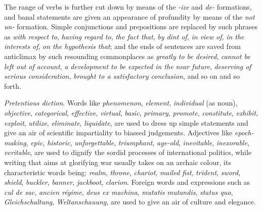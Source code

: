 The range of verbs is further cut down by means of the \textit{-ize} and \textit{de-} formations, and banal statements are given an appearance of profundity by means of the \textit{not un-} formation. Simple conjunctions and prepositions are replaced by such phrases as \textit{with respect to},\textit{ having regard to}, \textit{the fact that}, \textit{by dint of}, \textit{in view of}, \textit{in the interests of}, \textit{on the hypothesis that}; and the ends of sentences are saved from anticlimax by such resounding commonplaces as \textit{greatly to be desired}, \textit{cannot be left out of account}, \textit{a development to be expected in the near future}, \textit{deserving of serious consideration}, \textit{brought to a satisfactory conclusion}, and so on and so forth.\par

\textit{Pretentious diction}. Words like \textit{phenomenon}, \textit{element}, \textit{individual }(as noun), \textit{objective}, \textit{categorical}, \textit{effective}, \textit{virtual}, \textit{basic}, \textit{primary}, \textit{promote}, \textit{constitute}, \textit{exhibit}, \textit{exploit}, \textit{utilize}, \textit{eliminate}, \textit{liquidate}, are used to dress up simple statements and give an air of scientific impartiality to biassed judgements. Adjectives like \textit{epoch-making}, \textit{epic}, \textit{historic}, \textit{unforgettable}, \textit{triumphant}, \textit{age-old}, \textit{inevitable}, \textit{inexorable}, \textit{veritable}, are used to dignify the sordid processes of international politics, while writing that aims at glorifying war usually takes on an archaic colour, its characteristic words being: \textit{realm}, \textit{throne}, \textit{chariot}, \textit{mailed fist}, \textit{trident}, \textit{sword}, \textit{shield}, \textit{buckler}, \textit{banner}, \textit{jackboot}, \textit{clarion}. Foreign words and expressions such as \textit{cul de sac}, \textit{ancien régime}, \textit{deus ex machina}, \textit{mutatis mutandis}, \textit{status quo}, \textit{Gleichschaltung}, \textit{Weltanschauung}, are used to give an air of culture and elegance.\par

